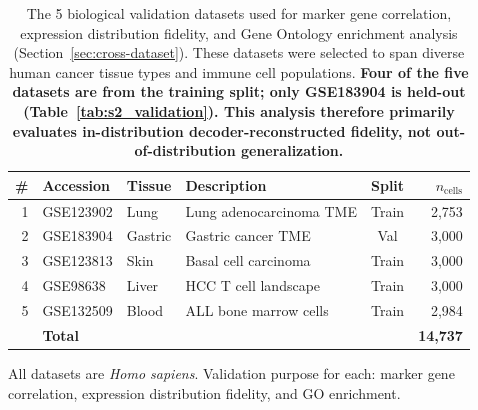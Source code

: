\documentclass[11pt,a4paper]{article}
\begin{document}
\begin{table}[!htbp]
\centering
\caption{The 5 biological validation datasets used for marker gene correlation, expression distribution fidelity, and Gene Ontology enrichment analysis (Section~\ref{sec:cross-dataset}). These datasets were selected to span diverse human cancer tissue types and immune cell populations. \textbf{Four of the five datasets are from the training split; only GSE183904 is held-out (Table~\ref{tab:s2_validation}). This analysis therefore primarily evaluates in-distribution decoder-reconstructed fidelity, not out-of-distribution generalization.}}
\label{tab:s4_biovalidation}
\small
\begin{tabularx}{\textwidth}{rllXcr}
\toprule
\# & Accession & Tissue & Description & Split & $n_{\text{cells}}$ \\
\midrule
  1 & GSE123902 & Lung & Lung adenocarcinoma TME & Train & 2,753 \\
  2 & GSE183904 & Gastric & Gastric cancer TME & Val & 3,000 \\
  3 & GSE123813 & Skin & Basal cell carcinoma & Train & 3,000 \\
  4 & GSE98638 & Liver & HCC T cell landscape & Train & 3,000 \\
  5 & GSE132509 & Blood & ALL bone marrow cells & Train & 2,984 \\
\midrule
  & \textbf{Total} & & & & \textbf{14,737} \\
\bottomrule
\end{tabularx}
\vspace{4pt}
{\footnotesize All datasets are \textit{Homo sapiens}. Validation purpose for each: marker gene correlation, expression distribution fidelity, and GO enrichment.}
\end{table}
\end{document}

